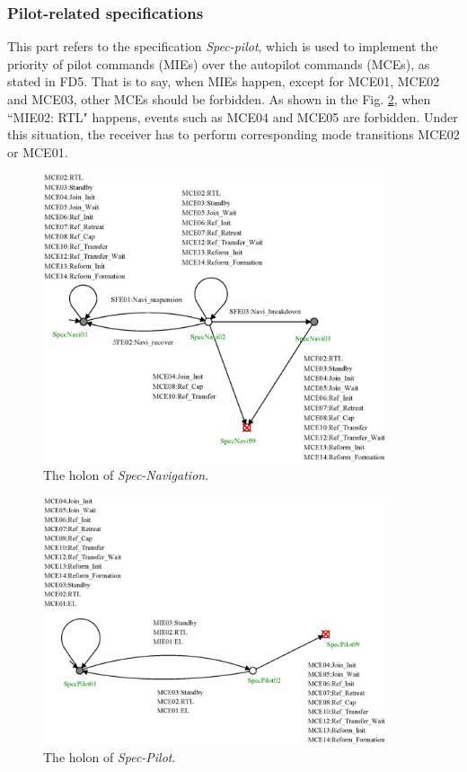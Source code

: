 \subsubsection{Pilot-related specifications}
This part refers to the specification \textit{Spec-pilot}, which is used to implement the priority of pilot commands (MIEs) over the autopilot commands (MCEs), as stated in FD5. That is to say, when MIEs happen, except for MCE01, MCE02 and MCE03, other MCEs should be forbidden. As shown in the Fig. \ref{fig:specpilot}, when ``MIE02: RTL" happens, events such as MCE04 and MCE05 are forbidden. Under this situation, the receiver has to perform corresponding mode transitions MCE02 or MCE01.
\begin{figure}[h]
	\begin{center}
		\includegraphics[width=0.9\textwidth]{Figures/Figs_Ch14/Fig20_HSNavi}
		\par\end{center}
	\caption{The holon of \textit{Spec-Navigation}.}
	\label{fig:specnavi} 
\end{figure}
\begin{figure}[h]
	\begin{center}
		\includegraphics[width=0.9\textwidth]{Figures/Figs_Ch14/Fig21_HSPilot}
		\par\end{center}
	\caption{The holon of \textit{Spec-Pilot}.}
	\label{fig:specpilot} 
\end{figure}	


